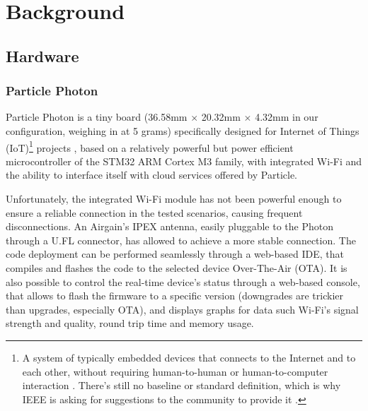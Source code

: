 \chapter{Background}

\section{Hardware}
\subsection{Particle Photon}
Particle Photon is a tiny board (36.58mm $\times$ 20.32mm $\times$ 4.32mm in our configuration, weighing in at 5 grams) specifically designed for Internet of Things (IoT)\footnote{A system of typically embedded devices that connects to the Internet and to each other, without requiring human-to-human or human-to-computer interaction \cite{IoTAgenda}. There's still no baseline or standard definition, which is why IEEE is asking for suggestions to the community to provide it \cite{IEEEIoT}.} projects \cite{ParticlePhoton}, based on a relatively powerful but power efficient microcontroller of the STM32 ARM Cortex M3 family, with integrated Wi-Fi and the ability to interface itself with cloud services offered by Particle.

Unfortunately, the integrated Wi-Fi module has not been powerful enough to ensure a reliable connection in the tested scenarios, causing frequent disconnections. An Airgain's IPEX antenna, easily pluggable to the Photon through a U.FL connector, has allowed to achieve a more stable connection.
The code deployment can be performed seamlessly through a web-based IDE, that compiles and flashes the code to the selected device Over-The-Air (OTA). It is also possible to control the real-time device's status through a web-based console, that allows to flash the firmware to a specific version (downgrades are trickier than upgrades, especially OTA), and displays graphs for data such Wi-Fi's signal strength and quality, round trip time and memory usage.

